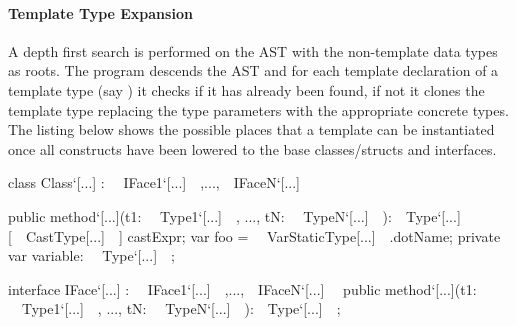 \documentclass{article}
\newcommand{\bt}{\ensuremath{^{\backprime}}}
\newcommand{\code}[1]{\texttt{\StrSubstitute{#1}{`}{\bt}}}
\newcommand{\bcode}[1]{\code{#1}}
\begin{document}
\paragraph{Template Type Expansion}
A depth first search is performed on the AST with the non-template data types as roots. The program descends the AST and for each template declaration of a template type (say \bcode{Tem`[Foo,Bar]}) it checks if it has already been found, if not it clones the template type replacing the type parameters with the appropriate concrete types. The listing below shows the possible places that a template can be instantiated once all constructs have been lowered to the base classes/structs and interfaces.
\begin{sooplisting}
class Class`[...] : ~~IFace1`[...]~~,...,~~IFaceN`[...]~~ {

	public method`[...](t1: ~~Type1`[...]~~, ..., tN: ~~TypeN`[...]~~):~~Type`[...]~~ {
		[~~CastType[...]~~] castExpr;
		var foo = ~~VarStaticType[...]~~.dotName;
	}	
	private var variable: ~~Type`[...]~~;
}

interface IFace`[...] : ~~IFace1`[...]~~,...,~~IFaceN`[...]~~ {
	public method`[...](t1: ~~Type1`[...]~~, ..., tN: ~~TypeN`[...]~~):~~Type`[...]~~;
}
\end{sooplisting}
\end{document}
